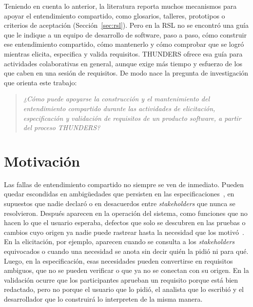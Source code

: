\documentclass[12pt,letterpaper,oneside]{report}
\begin{document}
Teniendo en cuenta lo anterior, la literatura reporta muchos mecanismos para
apoyar el entendimiento compartido, como glosarios, talleres, prototipos o
criterios de aceptación (Sección~\ref{sec:rsl}). Pero en la RSL no se encontró
una guía que le indique a un equipo de desarrollo de software, paso a paso, cómo construir ese
entendimiento compartido, cómo mantenerlo y cómo comprobar que se logró mientras elicita,
especifica y valida requisitos. THUNDERS ofrece esa guía para actividades colaborativas en general, aunque exige más tiempo y esfuerzo de los que caben en
una sesión de requisitos. De modo nace la pregunta de investigación que orienta este trabajo:

\begin{quote}
\emph{¿Cómo puede apoyarse la construcción y el mantenimiento del entendimiento
compartido durante las actividades de elicitación, especificación y validación
de requisitos de un producto software, a partir del proceso THUNDERS?}
\end{quote}

\section{Motivación}
Las fallas de entendimiento compartido no siempre se ven de inmediato. Pueden quedar escondidas en ambigüedades que persisten en las
especificaciones~\cite{asadabadi2020ambiguity}, en supuestos que nadie declaró o en desacuerdos entre \textit{stakeholders} que nunca se resolvieron. Después
aparecen en la operación del sistema, como funciones que no hacen lo que el
usuario esperaba, defectos que solo se descubren en las pruebas o cambios cuyo
origen ya nadie puede rastrear hasta la necesidad que los
motivó~\cite{fucci2022traceability}. En la elicitación, por ejemplo, aparecen
cuando se consulta a los \textit{stakeholders} equivocados o cuando una
necesidad se anota sin decir quién la pidió ni para qué. Luego, en la
especificación, esas necesidades pueden convertirse en requisitos ambiguos, que
no se pueden verificar o que ya no se conectan con su origen. En la validación
ocurre que los participantes aprueban un requisito porque está bien redactado,
pero no porque el usuario que lo pidió, el analista que lo escribió y el
desarrollador que lo construirá lo interpreten de la misma manera.
\end{document}
